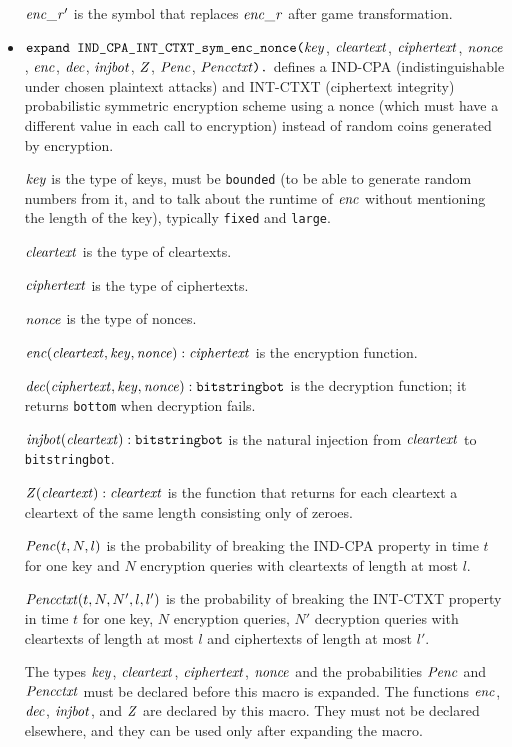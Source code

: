 \documentclass{article}
\begin{document}
\begin{itemize}
  $\mathit{enc\_r}'$ is the symbol that replaces $\mathit{enc\_r}$ after game transformation.

\item $\texttt{expand IND\_CPA\_INT\_CTXT\_sym\_enc\_nonce(}\mathit{key}$,
  $\mathit{cleartext}$, $\mathit{ciphertext}$, $\mathit{nonce}$, $\mathit{enc}$,
  $\mathit{dec}$, $\mathit{injbot}$, $\mathit{Z}$, $\mathit{Penc}$, $\mathit{Pencctxt}\texttt{).}$ defines a
  IND-CPA (indistinguishable under chosen plaintext attacks) and INT-CTXT (ciphertext integrity)
  probabilistic symmetric encryption scheme using a nonce 
   (which must have a different value in each call to encryption)
   instead of random coins generated by encryption.

   $\mathit{key}$ is the type of keys, must be \texttt{bounded} (to be able to generate random numbers from it, and to talk about the runtime of $\mathit{enc}$ without mentioning the length of the key), typically \texttt{fixed} and \texttt{large}.

   $\mathit{cleartext}$ is the type of cleartexts.

   $\mathit{ciphertext}$ is the type of ciphertexts.

   $\mathit{nonce}$ is the type of nonces.

   $\mathit{enc}(\mathit{cleartext}, \mathit{key}, \mathit{nonce}): \mathit{ciphertext}$ is the encryption function.

   $\mathit{dec}(\mathit{ciphertext}, \mathit{key}, \mathit{nonce}): \texttt{bitstringbot}$ is the
  decryption function; it returns \texttt{bottom} when decryption
  fails.

   $\mathit{injbot}(\mathit{cleartext}): \texttt{bitstringbot}$ is the natural
  injection from $\mathit{cleartext}$ to \texttt{bitstringbot}.

   $\mathit{Z}(\mathit{cleartext}): \mathit{cleartext}$ is the function that
  returns for each cleartext a cleartext of the same length consisting
  only of zeroes.

  $\mathit{Penc}(t, N, l)$ is the probability of breaking the IND-CPA
  property in time $t$ for one key and $N$ encryption queries with
  cleartexts of length at most $l$.

  $\mathit{Pencctxt}(t, N, N', l, l')$ is the probability of breaking the
  INT-CTXT property in time $t$ for one key, $N$ encryption queries,
  $N'$ decryption queries with cleartexts of length at most $l$ and
  ciphertexts of length at most $l'$.

   The types $\mathit{key}$, $\mathit{cleartext}$,
   $\mathit{ciphertext}$, $\mathit{nonce}$ and the probabilities $\mathit{Penc}$ and $\mathit{Pencctxt}$ must
   be declared before this macro is expanded. The functions
   $\mathit{enc}$, $\mathit{dec}$, $\mathit{injbot}$, and $\mathit{Z}$ are declared by this
   macro. They must not be declared elsewhere, and they can be used
   only after expanding the macro.


\end{itemize}
\end{document}
